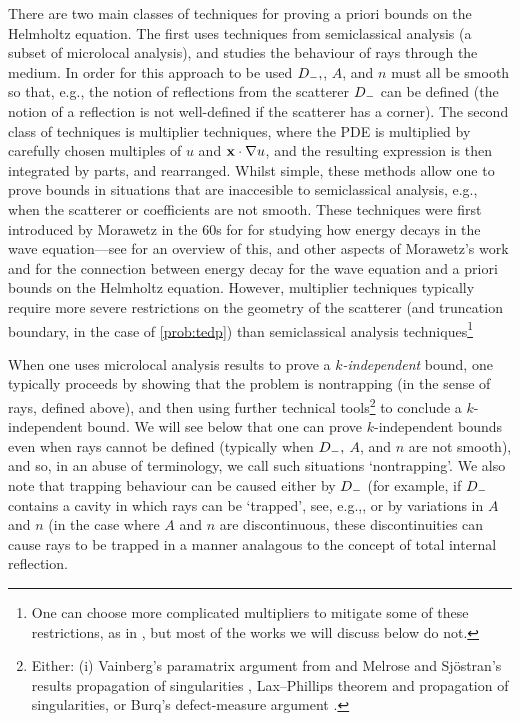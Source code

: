     There are two main classes of techniques for proving a priori bounds on the Helmholtz equation. The first uses techniques from semiclassical analysis (a subset of microlocal analysis), and studies the behaviour of rays through the medium. In order for this approach to be used $D_{-},$, $A$, and $n$ must all be smooth so that, e.g., the notion of reflections from the scatterer $D_{-}$ can be defined (the notion of a reflection is not well-defined if the scatterer has a corner). The second class of techniques is multiplier techniques, where the PDE is multiplied by carefully chosen multiples of $u$ and $\mathbf{x}\cdot\nabla u$, and the resulting expression is then integrated by parts, and rearranged. Whilst simple, these methods allow one to prove bounds in situations that are inaccesible to semiclassical analysis, e.g., when the scatterer or coefficients are not smooth. These techniques were first introduced by Morawetz in the 60s for for studying how energy decays in the wave equation---see \cite{GaGrPaSaSoTa:18} for an overview of this, and other aspects of Morawetz's work and for the connection between energy decay for the wave equation and a priori bounds on the Helmholtz equation. However, multiplier techniques typically require more severe restrictions on the geometry of the scatterer (and truncation boundary, in the case of \cref{prob:tedp}) than semiclassical analysis techniques\footnote{One can choose more complicated multipliers to mitigate some of these restrictions, as in \cite{MoRaSt:77}, but most of the works we will discuss below do not.}

When one uses microlocal analysis results to prove a \emph{$k$-independent} bound, one typically proceeds by showing that the problem is nontrapping (in the sense of rays, defined above), and then using further technical tools\footnote{Either: (i) Vainberg's paramatrix argument from \cite{Va:75} and Melrose and Sj\"ostran's results propagation of singularities \cite{MeSj:82}, Lax--Phillips theorem \cite{LaPh:??} and propagation of singularities, or Burq's defect-measure argument \cite{Bu:02}.} to conclude a $k$-independent bound. We will see below that one can prove $k$-independent bounds even when rays cannot be defined (typically when $D_{-},$ $A$, and $n$ are not smooth), and so, in an abuse of terminology, we call such situations `nontrapping'. We also note that trapping behaviour can be caused either by $D_{-}$ (for example, if $D_{-}$ contains a cavity in which rays can be `trapped', see, e.g.,, or by variations in $A$ and $n$ (in the case where $A$ and $n$ are discontinuous, these discontinuities can cause rays to be trapped in a manner analagous to the concept of total internal reflection.

